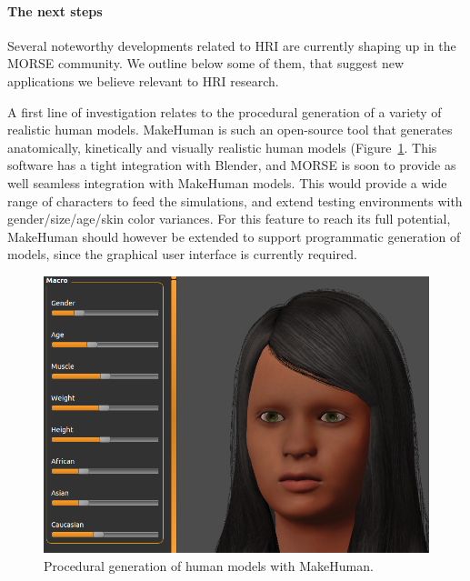 \documentclass[conference]{IEEEtran}
\begin{document}
%


\paragraph*{The next steps}

Several noteworthy developments related to HRI are currently shaping up in the
MORSE community. We outline below some of them, that suggest new applications we
believe relevant to HRI research.

A first line of investigation relates to the procedural generation of a variety
of realistic human models. {\sc MakeHuman} is such an open-source tool that
generates anatomically, kinetically and visually realistic human models
(Figure~\ref{fig:makehuman}. This software has a tight integration with Blender,
and MORSE is soon to provide as well seamless integration with {\sc MakeHuman}
models. This would provide a wide range of characters to feed the simulations,
and extend testing environments with gender/size/age/skin color variances.  For
this feature to reach its full potential, {\sc MakeHuman} should however be
extended to support programmatic generation of models, since the graphical user
interface is currently required.

\begin{figure}[tb]
  \centering
  \includegraphics[width=.9\columnwidth]{figs/makehuman.png}
  \caption{Procedural generation of human models with {\sc MakeHuman}.}
  \label{fig:makehuman}
\end{figure}
\end{document}
